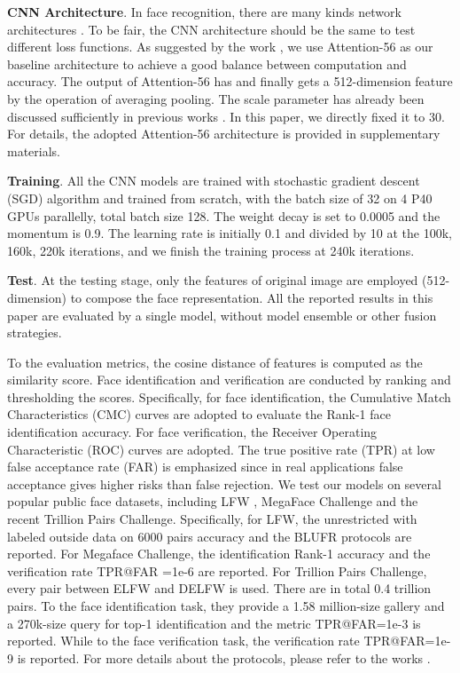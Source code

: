 \documentclass[10pt,twocolumn,letterpaper]{article}
\begin{document}
\noindent \textbf{CNN Architecture}. In face recognition, there are many kinds network architectures \cite{SphereFace,AM-Softmax,wang2018devil}. To be fair, the CNN architecture should be the same to test different loss functions. As suggested by the work \cite{wang2018devil}, we use Attention-56 \cite{Attention56} as our baseline architecture to achieve a good balance between computation and accuracy. The output of Attention-56 has and finally gets a 512-dimension feature by the operation of averaging pooling. The scale parameter  has already been discussed sufficiently in previous works \cite{AM-Softmax,cosface}. In this paper, we directly fixed it to 30. For details, the adopted Attention-56 architecture is provided in supplementary materials.






\noindent \textbf{Training}. All the CNN models are trained with stochastic gradient descent (SGD) algorithm and trained from scratch, with the batch size of 32 on 4 P40 GPUs parallelly, total batch size 128. The weight decay is set to 0.0005 and the momentum is 0.9. The learning rate is initially 0.1 and divided by 10 at the 100k, 160k, 220k iterations, and we finish the training process at 240k iterations.

\noindent \textbf{Test}. At the testing stage, only the features of original image are employed (512-dimension) to compose the face representation. All the reported results in this paper are evaluated by a single model, without model ensemble or other fusion strategies.

To the evaluation metrics, the cosine distance of features is computed as the similarity score. Face identification and verification are conducted by ranking and thresholding the scores. Specifically, for face identification, the Cumulative Match Characteristics (CMC) curves are adopted to evaluate the Rank-1 face identification accuracy. For face verification, the Receiver Operating Characteristic (ROC) curves are adopted. The true positive rate (TPR) at low false acceptance rate (FAR) is emphasized since in real applications false acceptance gives higher risks than false rejection. We test our models on several popular public face datasets, including LFW \cite{LFW}, MegaFace Challenge \cite{megaface_1,megaface_2} and the recent Trillion Pairs Challenge. Specifically, for LFW, the unrestricted with labeled outside data on 6000 pairs accuracy \cite{LFW} and the BLUFR \cite{blufr} protocols are reported. For Megaface Challenge, the identification Rank-1 accuracy and the verification rate TPR@FAR =1e-6 are reported. For Trillion Pairs Challenge, every pair between ELFW and DELFW is used. There are in total 0.4 trillion pairs. To the face identification task, they provide a 1.58 million-size gallery and a 270k-size query for top-1 identification and the metric TPR@FAR=1e-3 is reported. While to the face verification task, the verification rate TPR@FAR=1e-9 is reported. For more details about the protocols, please refer to the works \cite{LFW,blufr,megaface_1}.
\end{document}
